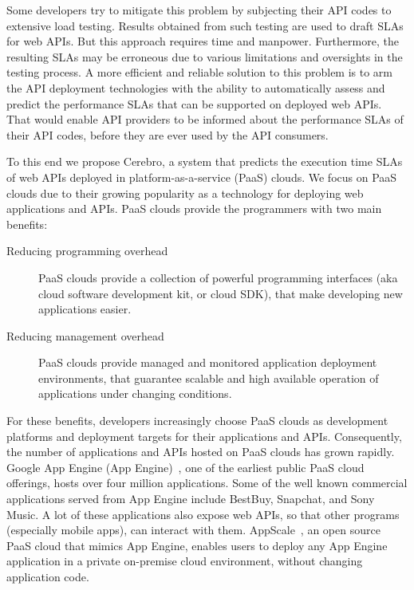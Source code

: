 Some developers try to mitigate this problem by subjecting their API codes to 
extensive load testing. Results obtained
from such testing are used to draft SLAs for web APIs.
But this approach requires time and manpower. Furthermore, the resulting SLAs
may be erroneous due to various limitations and oversights in the testing process.
A more efficient and reliable solution to this problem is to 
arm the API deployment technologies with the ability to automatically assess and
predict the performance SLAs that can be supported on deployed web APIs. 
That would enable API providers to be informed about the performance
SLAs of their API codes, before they are ever used by the API consumers. 

To this end we propose Cerebro, a system that predicts the execution time SLAs of web APIs
deployed in platform-as-a-service (PaaS) clouds. We focus on PaaS clouds due to their
growing popularity as a technology for deploying web applications and APIs.
PaaS clouds provide the programmers with two main benefits:

\begin{description}
\item[Reducing programming overhead] PaaS clouds provide a collection of powerful programming 
interfaces (aka cloud software development kit, or cloud SDK), that make developing new applications 
easier.
\item[Reducing management overhead] PaaS clouds provide managed and monitored application deployment
environments, that guarantee scalable and high available operation of applications under changing conditions.
\end{description}

For these benefits, developers increasingly choose PaaS clouds as development platforms
and deployment targets for their applications and APIs. Consequently, the number of applications and 
APIs hosted on PaaS clouds has grown rapidly. Google App Engine (App Engine)~\cite{gae}, one of the earliest
public PaaS cloud offerings, hosts over four million applications. Some of the
well known commercial applications served from App Engine include BestBuy, Snapchat, 
and Sony Music. A lot of these applications also expose web APIs, so that other
programs (especially mobile apps), can interact with them. AppScale~\cite{6488671}, an open source PaaS cloud that
mimics App Engine, enables users to deploy any App Engine application in a private on-premise
cloud environment, without changing application code. 

